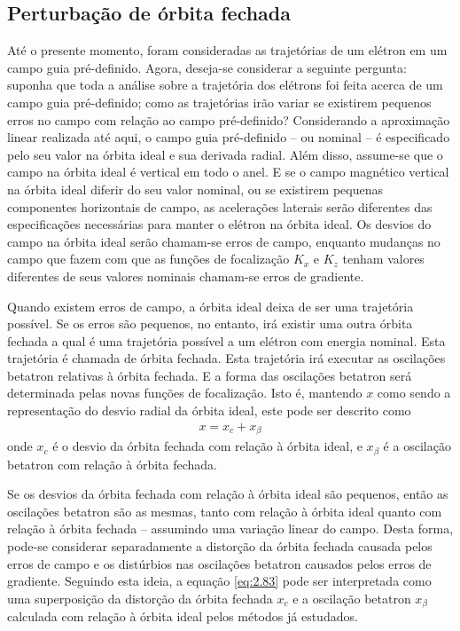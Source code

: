 \subsection{Perturbação de órbita fechada}\label{sec:2.10}
Até o presente momento, foram consideradas as trajetórias de um elétron em um campo guia pré-definido. Agora, deseja-se considerar a seguinte pergunta: suponha que toda a análise sobre a trajetória dos elétrons foi feita acerca de um campo guia pré-definido; como as trajetórias irão variar se existirem pequenos erros no campo com relação ao campo pré-definido? Considerando a aproximação linear realizada até aqui, o campo guia pré-definido -- ou nominal -- é especificado pelo seu valor na órbita ideal e sua derivada radial. Além disso, assume-se que o campo na órbita ideal é vertical em todo o anel. E se o campo magnético vertical na órbita ideal diferir do seu valor nominal, ou se existirem pequenas componentes horizontais de campo, as acelerações laterais serão diferentes das especificações necessárias para manter o elétron na órbita ideal. Os desvios do campo na órbita ideal serão chamam-se erros de campo, enquanto mudanças no campo que fazem com que as funções de focalização $K_x$ e $K_z$ tenham valores diferentes de seus valores nominais chamam-se erros de gradiente.

Quando existem erros de campo, a órbita ideal deixa de ser uma trajetória possível. Se os erros são pequenos, no entanto, irá existir uma outra órbita fechada a qual é uma trajetória possível a um elétron com energia nominal. Esta trajetória é chamada de órbita fechada. Esta trajetória irá executar as oscilações betatron relativas à órbita fechada. E a forma das oscilações betatron será determinada pelas novas funções de focalização. Isto é, mantendo $x$ como sendo a representação do desvio radial da órbita ideal, este pode ser descrito como
\begin{align}
	x = x_c + x_\beta\label{eq:2.83}
\end{align}
onde $x_c$ é o desvio da órbita fechada com relação à órbita ideal, e $x_\beta$ é a oscilação betatron com relação à órbita fechada.

Se os desvios da órbita fechada com relação à órbita ideal são pequenos, então as oscilações betatron são as mesmas, tanto com relação à órbita ideal quanto com relação à órbita fechada -- assumindo uma variação linear do campo. Desta forma, pode-se considerar separadamente a distorção da órbita fechada causada pelos erros de campo e os distúrbios nas oscilações betatron causados pelos erros de gradiente. Seguindo esta ideia, a equação \eqref{eq:2.83} pode ser interpretada como uma superposição da distorção da órbita fechada $x_c$ e a oscilação betatron $x_\beta$ calculada com relação à órbita ideal pelos métodos já estudados.

